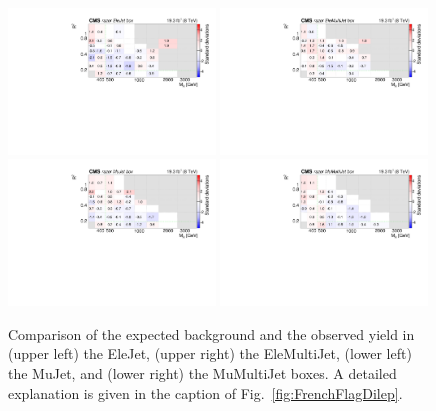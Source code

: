 \begin{figure}[tb!]
\centering
\includegraphics[width=0.49\textwidth]{figs/analysis8TeV/nSigmaLog_EleJet.pdf}
\includegraphics[width=0.49\textwidth]{figs/analysis8TeV/nSigmaLog_EleMultiJet.pdf}
\includegraphics[width=0.49\textwidth]{figs/analysis8TeV/nSigmaLog_MuJet.pdf}
\includegraphics[width=0.49\textwidth]{figs/analysis8TeV/nSigmaLog_MuMultiJet.pdf}
\caption{Comparison of the expected background and the observed yield
  in (upper left) the EleJet, (upper right) the EleMultiJet, (lower left) the MuJet, and (lower right) the MuMultiJet
  boxes. A detailed explanation is given in the caption of
  Fig.~\ref{fig:FrenchFlagDilep}.\label{fig:FrenchFlagLep}}
\end{figure}

